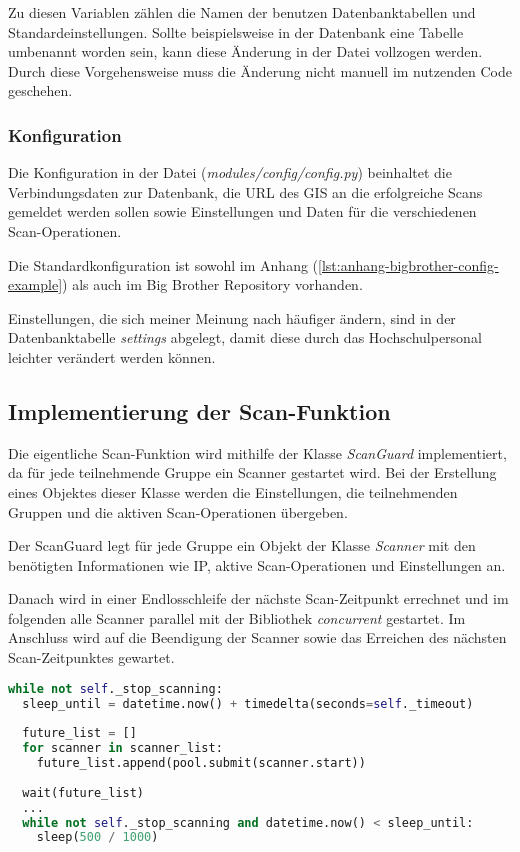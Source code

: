 Zu diesen Variablen zählen die Namen der benutzen Datenbanktabellen und Standardeinstellungen.
Sollte beispielsweise in der Datenbank eine Tabelle umbenannt worden sein, kann diese Änderung in der Datei vollzogen werden. Durch diese Vorgehensweise muss die Änderung nicht manuell im nutzenden Code geschehen.

\subsubsection{Konfiguration}

Die Konfiguration in der Datei (\textit{modules/config/config.py}) beinhaltet die Verbindungsdaten zur Datenbank, die URL des GIS an die erfolgreiche Scans gemeldet werden sollen sowie Einstellungen und Daten für die verschiedenen Scan-Operationen.

Die Standardkonfiguration ist sowohl im Anhang (\ref{lst:anhang-bigbrother-config-example}) als auch im Big Brother Repository vorhanden.

Einstellungen, die sich meiner Meinung nach häufiger ändern, sind in der Datenbanktabelle \textit{settings} abgelegt, damit diese durch das Hochschulpersonal leichter verändert werden können.

\subsection{Implementierung der Scan-Funktion}

Die eigentliche Scan-Funktion wird mithilfe der Klasse \textit{ScanGuard} implementiert, da für jede teilnehmende Gruppe ein Scanner gestartet wird. Bei der Erstellung eines Objektes dieser Klasse werden die Einstellungen, die teilnehmenden Gruppen und die aktiven Scan-Operationen übergeben.

Der ScanGuard legt für jede Gruppe ein Objekt der Klasse \textit{Scanner} mit den benötigten Informationen wie IP, aktive Scan-Operationen und Einstellungen an.

Danach wird in einer Endlosschleife der nächste Scan-Zeitpunkt errechnet und im folgenden alle Scanner parallel mit der Bibliothek \textit{concurrent} gestartet. Im Anschluss wird auf die Beendigung der Scanner sowie das Erreichen des nächsten Scan-Zeitpunktes gewartet.

\begin{lstlisting}[language=Python, frame=single, caption={Big Brother ScanGaurd}, captionpos=b, label={lst:bigbrother-scanguard}]
while not self._stop_scanning:
  sleep_until = datetime.now() + timedelta(seconds=self._timeout)
  
  future_list = []
  for scanner in scanner_list:
    future_list.append(pool.submit(scanner.start))
    
  wait(future_list)
  ...
  while not self._stop_scanning and datetime.now() < sleep_until:
    sleep(500 / 1000)
\end{lstlisting}

